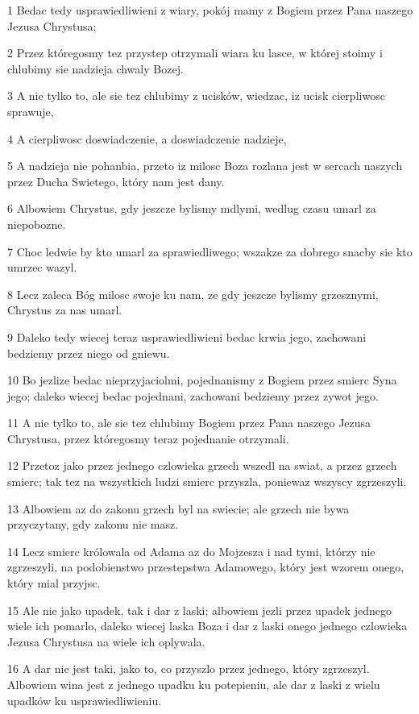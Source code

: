 \par 1 Bedac tedy usprawiedliwieni z wiary, pokój mamy z Bogiem przez Pana naszego Jezusa Chrystusa;
\par 2 Przez któregosmy tez przystep otrzymali wiara ku lasce, w której stoimy i chlubimy sie nadzieja chwaly Bozej.
\par 3 A nie tylko to, ale sie tez chlubimy z ucisków, wiedzac, iz ucisk cierpliwosc sprawuje,
\par 4 A cierpliwosc doswiadczenie, a doswiadczenie nadzieje,
\par 5 A nadzieja nie pohanbia, przeto iz milosc Boza rozlana jest w sercach naszych przez Ducha Swietego, który nam jest dany.
\par 6 Albowiem Chrystus, gdy jeszcze bylismy mdlymi, wedlug czasu umarl za niepobozne.
\par 7 Choc ledwie by kto umarl za sprawiedliwego; wszakze za dobrego snacby sie kto umrzec wazyl.
\par 8 Lecz zaleca Bóg milosc swoje ku nam, ze gdy jeszcze bylismy grzesznymi, Chrystus za nas umarl.
\par 9 Daleko tedy wiecej teraz usprawiedliwieni bedac krwia jego, zachowani bedziemy przez niego od gniewu.
\par 10 Bo jezlize bedac nieprzyjaciolmi, pojednanismy z Bogiem przez smierc Syna jego; daleko wiecej bedac pojednani, zachowani bedziemy przez zywot jego.
\par 11 A nie tylko to, ale sie tez chlubimy Bogiem przez Pana naszego Jezusa Chrystusa, przez któregosmy teraz pojednanie otrzymali.
\par 12 Przetoz jako przez jednego czlowieka grzech wszedl na swiat, a przez grzech smierc; tak tez na wszystkich ludzi smierc przyszla, poniewaz wszyscy zgrzeszyli.
\par 13 Albowiem az do zakonu grzech byl na swiecie; ale grzech nie bywa przyczytany, gdy zakonu nie masz.
\par 14 Lecz smierc królowala od Adama az do Mojzesza i nad tymi, którzy nie zgrzeszyli, na podobienstwo przestepstwa Adamowego, który jest wzorem onego, który mial przyjsc.
\par 15 Ale nie jako upadek, tak i dar z laski; albowiem jezli przez upadek jednego wiele ich pomarlo, daleko wiecej laska Boza i dar z laski onego jednego czlowieka Jezusa Chrystusa na wiele ich oplywala.
\par 16 A dar nie jest taki, jako to, co przyszlo przez jednego, który zgrzeszyl. Albowiem wina jest z jednego upadku ku potepieniu, ale dar z laski z wielu upadków ku usprawiedliwieniu.
